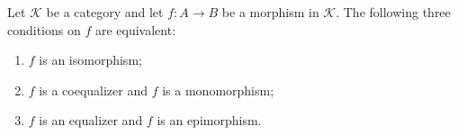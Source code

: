 Let $\mathcal{K}$ be a category and let $f: A \longrightarrow B$ be a morphism in $\mathcal{K}$. The following three conditions on $f$ are equivalent:
\begin{enumerate}
\item[(1)] $f$ is an isomorphism;
\item[(2)] $f$ is a coequalizer and $f$ is a monomorphism;
\item[(3)] $f$ is an equalizer and $f$ is an epimorphism.
\end{enumerate}
